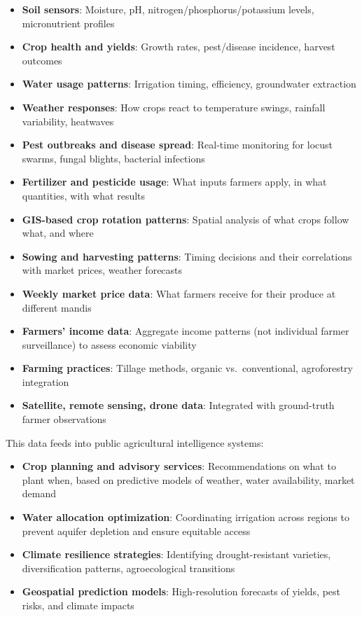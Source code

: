 \begin{itemize}
\tightlist
\item
  \textbf{Soil sensors}: Moisture, pH, nitrogen/phosphorus/potassium
  levels, micronutrient profiles
\item
  \textbf{Crop health and yields}: Growth rates, pest/disease incidence,
  harvest outcomes
\item
  \textbf{Water usage patterns}: Irrigation timing, efficiency,
  groundwater extraction
\item
  \textbf{Weather responses}: How crops react to temperature swings,
  rainfall variability, heatwaves
\item
  \textbf{Pest outbreaks and disease spread}: Real-time monitoring for
  locust swarms, fungal blights, bacterial infections
\item
  \textbf{Fertilizer and pesticide usage}: What inputs farmers apply, in
  what quantities, with what results
\item
  \textbf{GIS-based crop rotation patterns}: Spatial analysis of what
  crops follow what, and where
\item
  \textbf{Sowing and harvesting patterns}: Timing decisions and their
  correlations with market prices, weather forecasts
\item
  \textbf{Weekly market price data}: What farmers receive for their
  produce at different mandis
\item
  \textbf{Farmers' income data}: Aggregate income patterns (not
  individual farmer surveillance) to assess economic viability
\item
  \textbf{Farming practices}: Tillage methods, organic vs.~conventional,
  agroforestry integration
\item
  \textbf{Satellite, remote sensing, drone data}: Integrated with
  ground-truth farmer observations
\end{itemize}

This data feeds into public agricultural intelligence systems:

\begin{itemize}
\tightlist
\item
  \textbf{Crop planning and advisory services}: Recommendations on what
  to plant when, based on predictive models of weather, water
  availability, market demand
\item
  \textbf{Water allocation optimization}: Coordinating irrigation across
  regions to prevent aquifer depletion and ensure equitable access
\item
  \textbf{Climate resilience strategies}: Identifying drought-resistant
  varieties, diversification patterns, agroecological transitions
\item
  \textbf{Geospatial prediction models}: High-resolution forecasts of
  yields, pest risks, and climate impacts
\end{itemize}

